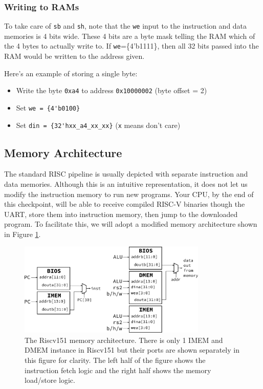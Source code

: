 \documentclass[11pt]{article}
\begin{document}
\subsubsection{Writing to RAMs}
To take care of \verb|sb| and \verb|sh|, note that the \verb|we| input to the instruction and data memories is 4 bits wide.
These 4 bits are a byte mask telling the RAM which of the 4 bytes to actually write to.
If \verb|we|=\{4'b1111\}, then all 32 bits passed into the RAM would be written to the address given.

Here's an example of storing a single byte:
\begin{itemize}
  \item Write the byte \verb|0xa4| to address \verb|0x10000002| (byte offset = 2)
  \item Set \verb|we = {4'b0100}|
  \item Set \verb|din = {32'hxx_a4_xx_xx}| (\verb|x| means don't care)
\end{itemize}

\subsection{Memory Architecture}
The standard RISC pipeline is usually depicted with separate instruction and data memories.
Although this is an intuitive representation, it does not let us modify the instruction memory to run new programs.
Your CPU, by the end of this checkpoint, will be able to receive compiled RISC-V binaries though the UART, store them into instruction memory, then jump to the downloaded program.
To facilitate this, we will adopt a modified memory architecture shown in Figure \ref{fig:mem_arch}.

\begin{figure}[hbt]
  \begin{center}
    \includegraphics[width=0.8\textwidth]{memory_arch.pdf}
    \caption{The Riscv151 memory architecture. There is only 1 IMEM and DMEM instance in Riscv151 but their ports are shown separately in this figure for clarity. The left half of the figure shows the instruction fetch logic and the right half shows the memory load/store logic.}
    \label{fig:mem_arch}
  \end{center}
\end{figure}
\end{document}
